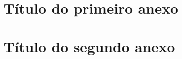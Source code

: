 \documentclass[12pt,a4paper,header]{abnt}
\begin{document}
% 





\anexo



\chapter{Título do primeiro anexo}




\chapter{Título do segundo anexo}

\end{document}

